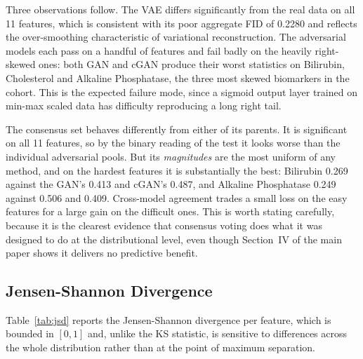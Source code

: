 \documentclass[journal,onecolumn]{IEEEtran}
\begin{document}
Three observations follow. The VAE differs significantly from the real data on all 11 features, which is consistent with its poor aggregate FID of 0.2280 and reflects the over-smoothing characteristic of variational reconstruction. The adversarial models each pass on a handful of features and fail badly on the heavily right-skewed ones: both GAN and cGAN produce their worst statistics on Bilirubin, Cholesterol and Alkaline Phosphatase, the three most skewed biomarkers in the cohort. This is the expected failure mode, since a sigmoid output layer trained on min-max scaled data has difficulty reproducing a long right tail.

The consensus set behaves differently from either of its parents. It is significant on all 11 features, so by the binary reading of the test it looks worse than the individual adversarial pools. But its \emph{magnitudes} are the most uniform of any method, and on the hardest features it is substantially the best: Bilirubin 0.269 against the GAN's 0.413 and cGAN's 0.487, and Alkaline Phosphatase 0.249 against 0.506 and 0.409. Cross-model agreement trades a small loss on the easy features for a large gain on the difficult ones. This is worth stating carefully, because it is the clearest evidence that consensus voting does what it was designed to do at the distributional level, even though Section~IV of the main paper shows it delivers no predictive benefit.

\subsection{Jensen-Shannon Divergence}

Table~\ref{tab:jsd} reports the Jensen-Shannon divergence per feature, which is bounded in $[0,1]$ and, unlike the KS statistic, is sensitive to differences across the whole distribution rather than at the point of maximum separation.
\end{document}

